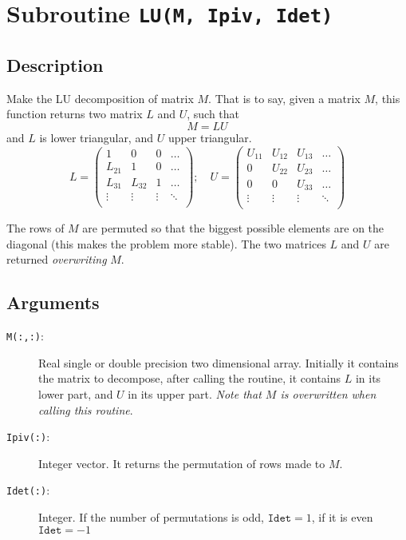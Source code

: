 \section{Subroutine \texttt{LU(M, Ipiv, Idet)}}

\subsection{Description}

Make the LU decomposition of matrix $M$. That is to say, given a
matrix $M$, this function returns two matrix $L$ and $U$, such that
\begin{equation}
  M = LU
\end{equation}
and $L$ is lower triangular, and $U$ upper triangular.
\begin{equation}
  L = \left(
    \begin{array}{cccc}
      1 & 0 & 0 &\dots \\
      L_{21} & 1 & 0 &\dots \\
      L_{31} & L_{32} & 1 &\dots \\
      \vdots & \vdots  & \vdots &\ddots \\
    \end{array}
  \right);\quad
  U = \left(
    \begin{array}{cccc}
      U_{11} & U_{12} & U_{13} &\dots \\
      0 & U_{22} & U_{23} &\dots \\
      0 & 0 & U_{33} &\dots \\
      \vdots & \vdots  & \vdots &\ddots \\
    \end{array}
  \right)
\end{equation}

The rows of $M$ are permuted so that the biggest possible elements are
on the diagonal (this makes the problem more stable). The two matrices
$L$ and $U$ are returned \emph{overwriting} $M$. 

\subsection{Arguments}

\begin{description}
\item[\texttt{M(:,:)}: ] Real single or double precision two dimensional
  array. Initially it contains the matrix to decompose, after calling
  the routine, it contains $L$ in its lower part, and $U$ in its upper
  part. \emph{Note that $M$ is overwritten when calling this routine}.
\item[\texttt{Ipiv(:)}: ] Integer vector. It returns the permutation of
  rows made to $M$.
\item[\texttt{Idet(:)}: ] Integer. If the number of permutations is odd,
  $\mathtt{Idet}=1$, if it is even $\mathtt{Idet}=-1$
\end{description}

